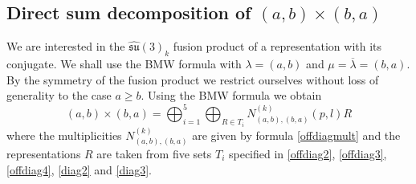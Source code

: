 \documentclass[a4paper,11pt]{article}
\theoremstyle{plain}
\theoremstyle{definition}
\newcommand{\aff}{\widehat{\mathfrak{su}}(3)_k}
\begin{document}
\subsection{Direct sum decomposition of  \texorpdfstring{$(a,b)\times(b,a)$}{(a,b)x(b,a)} } \label{sec4.2}

We are interested in the $\aff$ fusion product of a representation with its conjugate. We shall use the BMW formula with $\lambda=(a,b)$ and $\mu=\overline{\lambda}=(b,a)$. By the symmetry of the fusion product we  restrict ourselves without loss of generality to the case $a\geq b$. Using the BMW formula  we obtain
\begin{equation} \label{abba}
    (a,b)\times (b,a) =\bigoplus_{i=1}^5\bigoplus_{R\in T_i} N^{(k)}_{(a,b),(b,a)}(p,l) R 
\end{equation}
where the multiplicities $N^{(k)}_{(a,b),(b,a)}$ are given by formula  \eqref{offdiagmult} and the representations $R$  are taken from five sets   $T_i$ 
specified in \eqref{offdiag2}, \eqref{offdiag3}, \eqref{offdiag4}, \eqref{diag2} and \eqref{diag3}.
\end{document}
